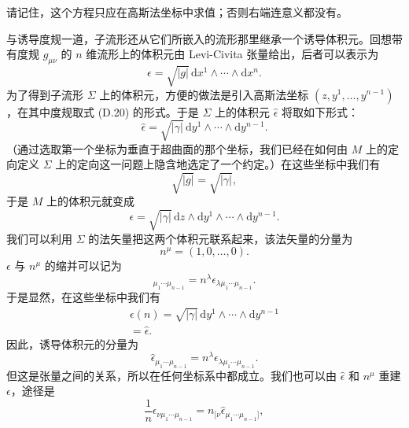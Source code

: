 请记住，这个方程只应在高斯法坐标中求值；否则右端连意义都没有。

与诱导度规一道，子流形还从它们所嵌入的流形那里继承一个诱导体积元。回想带有度规 $g_{\mu\nu}$ 的 $n$ 维流形上的体积元由 Levi-Civita 张量给出，后者可以表示为
\begin{equation*}
\epsilon = \sqrt{|g|} \, \mathrm{d}x^1 \wedge \cdots \wedge \mathrm{d}x^n.
\tag{D.28}
\end{equation*}
为了得到子流形 $\Sigma$ 上的体积元，方便的做法是引入高斯法坐标 $(z, y^1, \ldots, y^{n-1})$，在其中度规取式 (D.20) 的形式。于是 $\Sigma$ 上的体积元 $\widehat{\epsilon}$ 将取如下形式：
\begin{equation*}
\widehat{\epsilon} = \sqrt{|\gamma|} \, \mathrm{d}y^1 \wedge \cdots \wedge \mathrm{d}y^{n-1}.
\tag{D.29}
\end{equation*}
（通过选取第一个坐标为垂直于超曲面的那个坐标，我们已经在如何由 $M$ 上的定向定义 $\Sigma$ 上的定向这一问题上隐含地选定了一个约定。）在这些坐标中我们有
\begin{equation*}
\sqrt{|g|} = \sqrt{|\gamma|},
\tag{D.30}
\end{equation*}
于是 $M$ 上的体积元就变成
\begin{equation*}
\epsilon = \sqrt{|\gamma|} \, \mathrm{d}z \wedge \mathrm{d}y^1 \wedge \cdots \wedge \mathrm{d}y^{n-1}.
\tag{D.31}
\end{equation*}
我们可以利用 $\Sigma$ 的法矢量把这两个体积元联系起来，该法矢量的分量为
\begin{equation*}
n^\mu = (1, 0, \ldots, 0).
\tag{D.32}
\end{equation*}
$\epsilon$ 与 $n^\mu$ 的缩并可以记为
\begin{equation*}
[\epsilon(n)]_{\mu_1 \cdots \mu_{n-1}} = n^\lambda \epsilon_{\lambda \mu_1 \cdots \mu_{n-1}}.
\tag{D.33}
\end{equation*}
于是显然，在这些坐标中我们有
\begin{gather*}
\epsilon(n) = \sqrt{|\gamma|} \, \mathrm{d}y^1 \wedge \cdots \wedge \mathrm{d}y^{n-1} \\
= \widehat{\epsilon}. \tag{D.34}
\end{gather*}
因此，诱导体积元的分量为
\begin{equation*}
\widehat{\epsilon}_{\mu_1 \cdots \mu_{n-1}} = n^\lambda \epsilon_{\lambda \mu_1 \cdots \mu_{n-1}}.
\tag{D.35}
\end{equation*}
但这是张量之间的关系，所以在任何坐标系中都成立。我们也可以由 $\widehat{\epsilon}$ 和 $n^\mu$ 重建 $\epsilon$，途径是
\begin{equation*}
\frac{1}{n} \epsilon_{\nu \mu_1 \cdots \mu_{n-1}} = n_{[\nu} \widehat{\epsilon}_{\mu_1 \cdots \mu_{n-1}]},
\tag{D.36}
\end{equation*}

